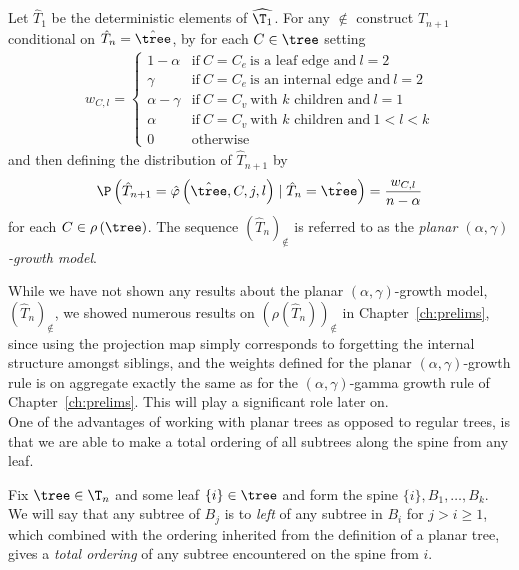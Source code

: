 \begin{defi}
    Let $\hat{T}_1$ be the deterministic elements of $\widehat{\T_1}$.
    For any $\nin$ construct $\hat{T}_{n+1}$ conditional on $\hat{T}_n = \hat{\tree}$, by for each $C \in \tree$ setting 
    \begin{align}
        w_{C, l}
        =
        \begin{cases}
            1 - \alpha & \text{if}\ C = C_e\ \text{is a leaf edge and}\ l = 2 \\
            \gamma & \text{if}\ C = C_e\ \text{is an internal edge and}\ l = 2 \\
            \alpha - \gamma & \text{if}\ C = C_v\ \text{with $k$ children and}\ l = 1 \\
            \alpha & \text{if}\ C = C_v\ \text{with $k$ children and}\ 1 < l < k \\
            0 & \text{otherwise}
        \end{cases}
        \label{weightsplanar}
    \end{align}
    and then defining the distribution of $\hat{T}_{n+1}$ by
    \begin{align}
        \P \left( \hat{T}_{n+1} = \hat{\varphi} \left( \hat{\tree}, C, j, l \right) \mid \hat{T}_n = \hat{\tree} \right)
        = \frac{w_{C,l}}{n - \alpha}
        \label{InsertionPlanarAlphaGamma}
    \end{align}
    for each $C \in \rho \left( \tree \right)$.
    The sequence ${\left( \hat{T}_n \right)}_\nin$ is referred to as the \textit{planar $(\alpha, \gamma)$-growth model}.
\end{defi}
%
While we have not shown any results about the planar $(\alpha, \gamma)$-growth model, ${\left( \hat{T}_n \right)}_\nin$, we showed numerous results on ${\left( \rho \left( \hat{T}_n \right) \right)}_\nin$ in Chapter~\ref{ch:prelims}, since using the projection map simply corresponds to forgetting the internal structure amongst siblings, and the weights defined for the planar $(\alpha, \gamma)$-growth rule is on aggregate exactly the same as for the $(\alpha, \gamma)$-gamma growth
rule of Chapter~\ref{ch:prelims}.
This will play a significant role later on. \\

One of the advantages of working with planar trees as opposed to regular trees, is that we are able to make a total ordering of all subtrees along the spine from any leaf.
%
\begin{defi}\label{totalordering}
  Fix $\tree \in \T_n$ and some leaf $\{i\} \in \tree$ and form the spine $\{i\}, B_1, \ldots, B_k$.
  We will say that any subtree of $B_j$ is to \textit{left} of any subtree in $B_i$ for $j > i \geq 1$, which combined with the ordering inherited from the definition of a planar tree, gives a \textit{total ordering} of any subtree encountered on the spine from ${i}$.    
\end{defi}
%
